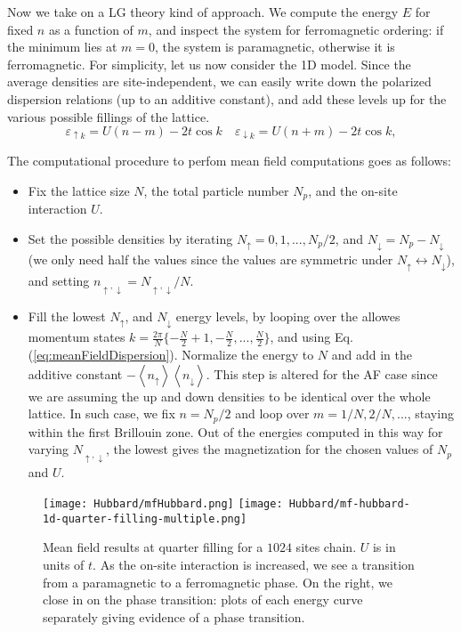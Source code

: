 Now we take on a \acl{LG} theory kind of approach.
We compute the energy $E$ for fixed $n$ as a function of $m$, and inspect the system for ferromagnetic ordering: if the minimum lies at $m = 0$, the system is paramagnetic, otherwise it is ferromagnetic.
For simplicity, let us now consider the \acs{1D} model.
Since the average densities are site-independent, we can easily write down the polarized dispersion relations (up to an additive constant), and add these levels up for the various possible fillings of the lattice.
\begin{equation}\label{eq:meanFieldDispersion}
\varepsilon_{\uparrow k} = U ( n - m ) - 2 t \cos k \quad \varepsilon_{\downarrow k} = U ( n + m ) - 2 t \cos k ,
\end{equation}

The computational procedure to perfom mean field computations goes as follows:
\begin{itemize}
\item Fix the lattice size $N$, the total particle number $N_p$, and the on-site interaction $U$.
\item Set the possible densities by iterating $N_\uparrow = 0, 1, ..., N_p / 2$, and $N_\downarrow = N_p - N_\downarrow$ (we only need half the values since the values are symmetric under $ N_\uparrow \leftrightarrow N_\downarrow$), and setting $n_{\uparrow, \downarrow} = N_{\uparrow, \downarrow} / N$.
\item Fill the lowest $N_\uparrow$, and $N_\downarrow$ energy levels, by looping over the allowes momentum states $k = \frac{2\pi}{N} \{ -\frac{N}{2} + 1, -\frac{N}{2}, ..., \frac{N}{2} \}$, and using Eq.(\ref{eq:meanFieldDispersion}).
Normalize the energy to $N$ and add in the additive constant $- \left\langle n_\uparrow \right\rangle \left\langle n_\downarrow \right\rangle$.
This step is altered for the \acs{AF} case since we are assuming the up and down densities to be identical over the whole lattice.
In such case, we fix $n = N_p / 2$ and loop over $m = 1/ N, 2 / N,...$, staying within the first Brillouin zone.
Out of the energies computed in this way for varying $N_{\uparrow, \downarrow}$, the lowest gives the magnetization for the chosen values of $N_p$ and $U$.
\end{itemize}
\begin{figure}
\hspace{-3mm}
\texttt{[image: Hubbard/mfHubbard.png]}
\hspace{-2.5mm}
\texttt{[image: Hubbard/mf-hubbard-1d-quarter-filling-multiple.png]}
	\caption[Mean field results for the \acs{1D} Hubbard model.]{Mean field results at quarter filling for a $ 1024$ sites chain.
	$U$ is in units of $t$.
	As the on-site interaction is increased, we see a transition from a paramagnetic to a ferromagnetic phase. On the right, we close in on the phase transition: plots of each energy curve separately giving evidence of a phase transition.}
	\label{fig:mft}
\end{figure}

